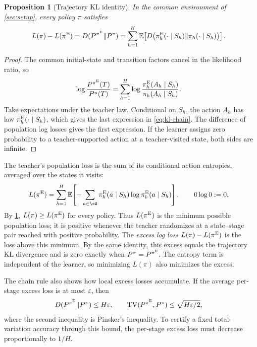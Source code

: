 \documentclass[11pt,twoside]{article}
\newcommand{\E}{\mathbb E}
\newcommand{\KL}{D}
\newcommand{\TV}{\mathrm{TV}}
\newtheorem{proposition}[theorem]{Proposition}
\theoremstyle{definition}
\theoremstyle{remark}
\begin{document}
\begin{proposition}[Trajectory KL identity]
\label{prop:kl}
In the common environment of \cref{sec:setup}, every policy $\pi$ satisfies
\begin{equation}
 L(\pi)-L(\pi^{\rm E})
 =\KL(P^{\pi^{\rm E}}\Vert P^\pi)
 =\sum_{h=1}^H
   \E\!\left[\KL\bigl(\pi_h^{\rm E}(\cdot\mid S_h)
                 \Vert\pi_h(\cdot\mid S_h)\bigr)\right].
 \label{eq:kl-chain}
\end{equation}
\end{proposition}

\begin{proof}
The common initial-state and transition factors cancel in the likelihood
ratio, so
\[
 \log\frac{P^{\pi^{\rm E}}(T)}{P^\pi(T)}
 =\sum_{h=1}^H
   \log\frac{\pi_h^{\rm E}(A_h\mid S_h)}{\pi_h(A_h\mid S_h)}.
\]
Take expectations under the teacher law. Conditional on $S_h$, the action
$A_h$ has law $\pi_h^{\rm E}(\cdot\mid S_h)$, which gives the last expression
in \cref{eq:kl-chain}. The difference of population log losses gives the
first expression. If the learner assigns zero probability to a
teacher-supported action at a teacher-visited state, both sides are infinite.
\end{proof}

The teacher's population loss is the sum of its conditional action
entropies, averaged over the states it visits:
\[
 L(\pi^{\rm E})
 =\sum_{h=1}^H\E\!\left[
   -\sum_{a\in\cA}\pi_h^{\rm E}(a\mid S_h)
                    \log\pi_h^{\rm E}(a\mid S_h)\right],
 \qquad 0\log0:=0.
\]
By \cref{prop:kl}, $L(\pi)\ge L(\pi^{\rm E})$ for every policy.
Thus $L(\pi^{\rm E})$ is the minimum possible population loss; it is
positive whenever the teacher randomizes at a state--stage pair reached
with positive probability. The \emph{excess log loss}
$L(\pi)-L(\pi^{\rm E})$ is the loss above this minimum. By the same
identity, this excess equals the trajectory KL divergence and is zero
exactly when $P^\pi=P^{\pi^{\rm E}}$. The entropy term is independent
of the learner, so minimizing $L(\pi)$ also minimizes the excess.

The chain rule also shows how local excess losses accumulate.
If the average per-stage excess loss is at most
$\varepsilon$, then
\begin{equation}
 \KL(P^{\pi^{\rm E}}\Vert P^\pi)\le H\varepsilon,
 \qquad
 \TV(P^{\pi^{\rm E}},P^\pi)\le\sqrt{H\varepsilon/2},
 \label{eq:population-pin}
\end{equation}
where the second inequality is Pinsker's inequality. To certify a fixed
total-variation accuracy through this bound, the per-stage excess loss must
decrease proportionally to $1/H$.
\end{document}
